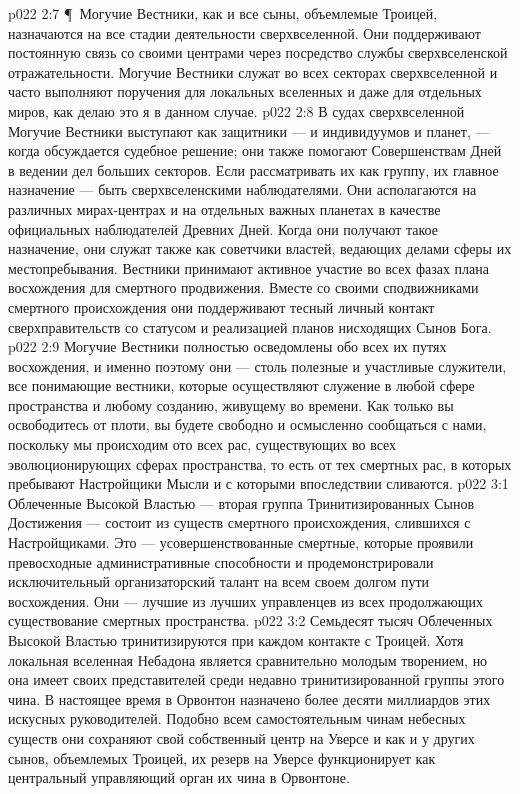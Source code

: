 \vs p022 2:7 \P\ Могучие Вестники, как и все сыны, объемлемые Троицей, назначаются на все стадии деятельности сверхвселенной. Они поддерживают постоянную связь со своими центрами через посредство службы сверхвселенской отражательности. Могучие Вестники служат во всех секторах сверхвселенной и часто выполняют поручения для локальных вселенных и даже для отдельных миров, как делаю это я в данном случае.
\vs p022 2:8 В судах сверхвселенной Могучие Вестники выступают как защитники --- и индивидуумов и планет, --- когда обсуждается судебное решение; они также помогают Совершенствам Дней в ведении дел больших секторов. Если рассматривать их как группу, их главное назначение --- быть сверхвселенскими наблюдателями. Они асполагаются на различных мирах\hyp{}центрах и на отдельных важных планетах в качестве официальных наблюдателей Древних Дней. Когда они получают такое назначение, они служат также как советчики властей, ведающих делами сферы их местопребывания. Вестники принимают активное участие во всех фазах плана восхождения для смертного продвижения. Вместе со своими сподвижниками смертного происхождения они поддерживают тесный личный контакт сверхправительств со статусом и реализацией планов нисходящих Сынов Бога.
\vs p022 2:9 Могучие Вестники полностью осведомлены обо всех их путях восхождения, и именно поэтому они --- столь полезные и участливые служители, все понимающие вестники, которые осуществляют служение в любой сфере пространства и любому созданию, живущему во времени. Как только вы освободитесь от плоти, вы будете свободно и осмысленно сообщаться с нами, поскольку мы происходим ото всех рас, существующих во всех эволюционирующих сферах пространства, то есть от тех смертных рас, в которых пребывают Настройщики Мысли и с которыми впоследствии сливаются.
\vs p022 3:1 Облеченные Высокой Властью --- вторая группа Тринитизированных Сынов Достижения --- состоит из существ смертного происхождения, слившихся с Настройщиками. Это --- усовершенствованные смертные, которые проявили превосходные административные способности и продемонстрировали исключительный организаторский талант на всем своем долгом пути восхождения. Они --- лучшие из лучших управленцев из всех продолжающих существование смертных пространства.
\vs p022 3:2 Семьдесят тысяч Облеченных Высокой Властью тринитизируются при каждом контакте с Троицей. Хотя локальная вселенная Небадона является сравнительно молодым творением, но она имеет своих представителей среди недавно тринитизированной группы этого чина. В настоящее время в Орвонтон назначено более десяти миллиардов этих искусных руководителей. Подобно всем самостоятельным чинам небесных существ они сохраняют свой собственный центр на Уверсе и как и у других сынов, объемлемых Троицей, их резерв на Уверсе функционирует как центральный управляющий орган их чина в Орвонтоне.
